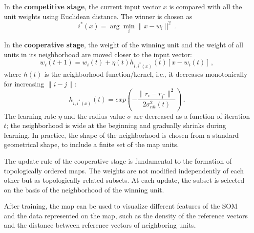 In the \textbf{competitive stage}, the current input vector $x$ is compared with all the unit weights using Euclidean distance. The winner is chosen as
\begin{equation*}
    i^*(x) = \arg \min_i \|x - w_i\|^2 \,.
\end{equation*}

In the \textbf{cooperative stage}, the weight of the winning unit and the weight of all units in its neighborhood are moved closer to the input vector:
\begin{equation*}
    w_i(t+1) = w_i(t) + \eta (t) h_{i,i^*(x)}(t)[x - w_i(t)] \,,
\end{equation*}
where $h(t)$ is the neighborhood function/kernel, i.e., it decreases monotonically for increasing $\|i-j\|$:
\begin{equation*}
    h_{i,i^*(x)}(t) = exp(-\dfrac{\|r_i - r_{i^*}\|^2}{2 \sigma_{nh}^2 (t)}) \,.
\end{equation*}
The learning rate $\eta$ and the radius value $\sigma$ are decreased as a function of iteration $t$; the neighborhood is wide at the beginning and gradually shrinks during learning. In practice, the shape of the neighborhood is chosen from a standard geometrical shape, to include a finite set of the map units.

The update rule of the cooperative stage is fundamental to the formation of topologically ordered maps. The weights are not modified independently of each other but as topologically related subsets. At each update, the subset is selected on the basis of the neighborhood of the winning unit.

After training, the map can be used to visualize different features of the SOM and the data represented on the map, such as the density of the reference vectors and the distance between reference vectors of neighboring units.